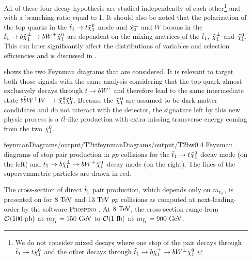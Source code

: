         All of these four decay hypothesis are studied independently
        of each other\footnote{We do not consider mixed decays where one stop of the pair
        decays through $\tilde{t}_1 \rightarrow t \tilde{\chi}_1^0$ and the other decays through
        $\tilde{t}_1 \rightarrow b \tilde{\chi}_1^\pm \rightarrow b W^{\pm} \tilde{\chi}_1^0$.} and with a
        branching ratio equal to 1. It should also be noted that the polarization of the
        top quarks in the $\tilde{t}_1 \rightarrow t \tilde{\chi}_1^0$ mode and $\tilde{\chi}_1^\pm$ and
        $W$ bosons in the $\tilde{t}_1 \rightarrow b \tilde{\chi}_1^\pm \rightarrow b W^{\pm}
        \tilde{\chi}_1^0$ are dependent on the mixing matrices of the $\tilde{t}_1$, $\tilde{\chi}_1^\pm$
        and $\tilde{\chi}_1^0$. This can later significantly affect the distributions of
        variables and selection efficiencies and is discussed in
        .

         shows the two Feynman diagrams that are
        considered. It is relevant to target both those signals with the same analysis
        considering that the top quark almost exclusively decays through $t \rightarrow
        b W^+$ and therefore lead to the same intermediate state $b \bar{b} W^+ W^- +
        \tilde{\chi}_1^0 \tilde{\chi}_1^0$. Because the $\tilde{\chi}_1^0$ are assumed to be dark
        matter candidates and do not interact with the detector, the signature left by
        this new physic process is a $t\bar{t}$-like production with extra missing
        transverse energy coming from the two $\tilde{\chi}_1^0$.

                         {feynmanDiagrams/output/T2tt}{feynmanDiagrams/output/T2bw}{0.4}
                         {Feynman diagrams of stop pair production in $pp$ collisions for the
                         $\tilde{t}_1 \rightarrow t \tilde{\chi}_1^0$ decay mode (on the left) and
                         $\tilde{t}_1 \rightarrow b \tilde{\chi}_1^\pm \rightarrow b W^{\pm} \tilde{\chi}_1^0$ decay mode
                         (on the right). The lines of the supersymmetric particles are drawn in red.}

        The cross-section of direct $\tilde{t}_1$ pair production, which depends only on $m_{\tilde{t}_1}$, is presented
        on  for $8~\text{TeV}$ and $13~\text{TeV}$ $pp$ collisions as computed at next-leading-order
        by the software \textsc{Prospino} . At $8~\text{TeV}$, the cross-section range from $\mathcal{O}(100~\text{pb})$
        at $m_{\tilde{t}_1} = 150~\text{GeV}$ to $\mathcal{O}(1~\text{fb})$ at $m_{\tilde{t}_1} = 900 ~\text{GeV}$.

